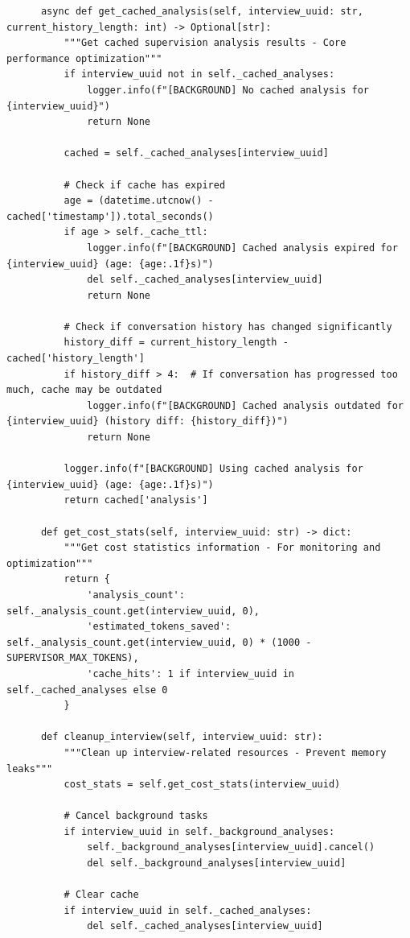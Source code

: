 \documentclass[sigchi,nonacm,manuscript]{acmart}
\begin{document}
\begin{lstlisting}
      async def get_cached_analysis(self, interview_uuid: str, current_history_length: int) -> Optional[str]:
          """Get cached supervision analysis results - Core performance optimization"""
          if interview_uuid not in self._cached_analyses:
              logger.info(f"[BACKGROUND] No cached analysis for {interview_uuid}")
              return None
          
          cached = self._cached_analyses[interview_uuid]
          
          # Check if cache has expired
          age = (datetime.utcnow() - cached['timestamp']).total_seconds()
          if age > self._cache_ttl:
              logger.info(f"[BACKGROUND] Cached analysis expired for {interview_uuid} (age: {age:.1f}s)")
              del self._cached_analyses[interview_uuid]
              return None
          
          # Check if conversation history has changed significantly
          history_diff = current_history_length - cached['history_length']
          if history_diff > 4:  # If conversation has progressed too much, cache may be outdated
              logger.info(f"[BACKGROUND] Cached analysis outdated for {interview_uuid} (history diff: {history_diff})")
              return None
          
          logger.info(f"[BACKGROUND] Using cached analysis for {interview_uuid} (age: {age:.1f}s)")
          return cached['analysis']
      
      def get_cost_stats(self, interview_uuid: str) -> dict:
          """Get cost statistics information - For monitoring and optimization"""
          return {
              'analysis_count': self._analysis_count.get(interview_uuid, 0),
              'estimated_tokens_saved': self._analysis_count.get(interview_uuid, 0) * (1000 - SUPERVISOR_MAX_TOKENS),
              'cache_hits': 1 if interview_uuid in self._cached_analyses else 0
          }
      
      def cleanup_interview(self, interview_uuid: str):
          """Clean up interview-related resources - Prevent memory leaks"""
          cost_stats = self.get_cost_stats(interview_uuid)
          
          # Cancel background tasks
          if interview_uuid in self._background_analyses:
              self._background_analyses[interview_uuid].cancel()
              del self._background_analyses[interview_uuid]
          
          # Clear cache
          if interview_uuid in self._cached_analyses:
              del self._cached_analyses[interview_uuid]
          

\end{lstlisting}
\end{document}
